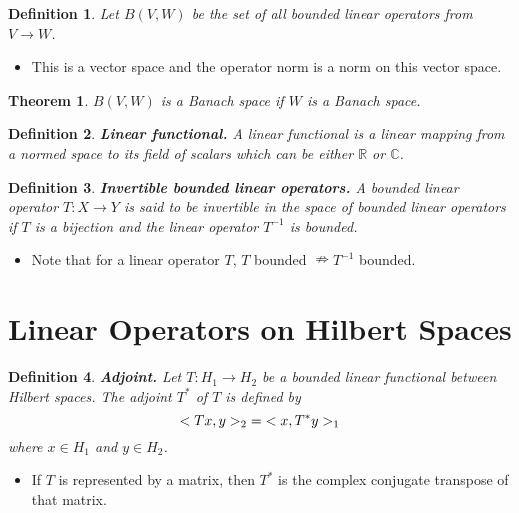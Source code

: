 \documentclass[two column]{article}
\newtheorem{theorem}{Theorem}[subsection]
\newtheorem{definition}{Definition}[subsection]
\begin{document}
\begin{definition}
Let $B(V,W)$ be the set of all bounded linear operators from $V \rightarrow W$. 
\end{definition}
\begin{itemize}
\item This is a vector space and the operator norm is a norm on this vector space.\\
\end{itemize}

\begin{theorem}
$B(V,W)$ is a Banach space if $W$ is a Banach space. \\
\end{theorem}

\begin{definition}
{\bf Linear functional.} A linear functional is a linear mapping from a normed space to its field of scalars which can be either $\mathbb{R}$ or $\mathbb{C}$. \\
\end{definition}

\begin{definition}
{\bf Invertible bounded linear operators.} A bounded linear operator $T : X \rightarrow Y$ is said to be invertible in the space of bounded linear operators if $T$ is a bijection and the linear operator $T^{-1}$ is bounded.  
\end{definition}
\begin{itemize}
\item Note that for a linear operator $T$, $T$ bounded $\nRightarrow T^{-1}$ bounded. 
\end{itemize}

\section{Linear Operators on Hilbert Spaces}

\begin{definition}
{\bf Adjoint.} Let $T : H_{1} \rightarrow H_{2}$ be a bounded linear functional between Hilbert spaces. The adjoint $T^{\ast}$ of $T$ is defined by \vspace{-8pt}
\[
< Tx,y >_{2} \; = \; < x,T^{\ast}y >_{1} \vspace{-8pt}
\]
where $x \in H_{1}$ and $y \in H_{2}$. 
\end{definition}
\begin{itemize}
\item If $T$ is represented by a matrix, then $T^{\ast}$ is the complex conjugate transpose of that matrix. \vspace{5pt}
\end{itemize}
\end{document}
